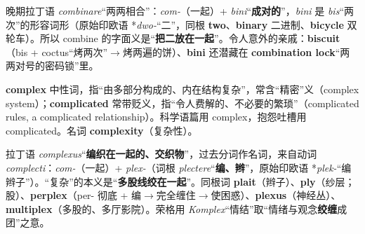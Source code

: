 \documentclass[../main.tex]{subfiles}
\begin{document}
\begin{origin}
晚期拉丁语 \textit{combinare}“两两相合”：\textit{com-}（一起）+ \textit{bini}“\textbf{成对的}”，\textit{bini} 是 \textit{bis}“两次”的形容词形（原始印欧语 *\textit{dwo-}“二”，同根 \textbf{two}、\textbf{binary} 二进制、\textbf{bicycle} 双轮车）。所以 combine 的字面义是“\textbf{把二放在一起}”。令人意外的亲戚：\textbf{biscuit}（bis + coctus“烤两次”$\to$烤两遍的饼）、\textbf{bini} 还潜藏在 \textbf{combination lock}“两两对号的密码锁”里。
\end{origin}





\begin{lex}
\textbf{complex} 中性词，指“由多部分构成的、内在结构复杂”，常含“精密”义（complex system）；\textbf{complicated} 常带贬义，指“令人费解的、不必要的繁琐”（complicated rules, a complicated relationship）。科学语篇用 complex，抱怨吐槽用 complicated。名词 \textbf{complexity}（复杂性）。
\end{lex}

\begin{origin}
拉丁语 \textit{complexus}“\textbf{编织在一起的、交织物}”，过去分词作名词，来自动词 \textit{complecti}：\textit{com-}（一起）+ \textit{plex-}（词根 \textit{plectere}“\textbf{编、辫}”，原始印欧语 *\textit{plek-}“编辫子”）。“复杂”的本义是“\textbf{多股线绞在一起}”。同根词 \textbf{plait}（辫子）、\textbf{ply}（纱层；股）、\textbf{perplex}（per- 彻底 + 编$\to$完全缠住$\to$使困惑）、\textbf{plexus}（神经丛）、\textbf{multiplex}（多股的、多厅影院）。荣格用 \textit{Komplex}“情结”取“情绪与观念\textbf{绞缠}成团”之意。
\end{origin}



\end{document}
